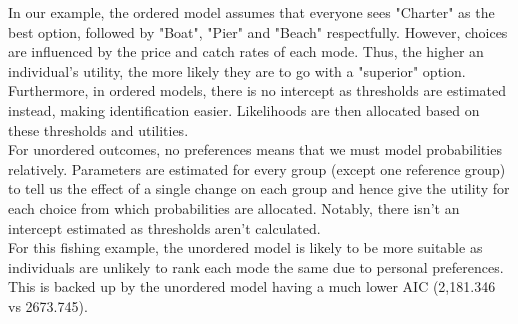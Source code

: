 \documentclass[12pt]{article}
\begin{document}
{In our example, the ordered model assumes that everyone sees "Charter" as the best option, followed by "Boat", "Pier" and "Beach" respectfully. However, choices are influenced by the price and catch rates of each mode. Thus, the higher an individual's utility, the more likely they are to go with a "superior" option. Furthermore, in ordered models, there is no intercept as thresholds are estimated instead, making identification easier. Likelihoods are then allocated based on these thresholds and utilities.\\

For unordered outcomes, no preferences means that we must model probabilities relatively. Parameters are estimated for every group (except one reference group) to tell us the effect of a single change on each group and hence give the utility for each choice from which probabilities are allocated. Notably, there isn't an intercept estimated as thresholds aren't calculated.\\

For this fishing example, the unordered model is likely to be more suitable as individuals are unlikely to rank each mode the same due to personal preferences. This is backed up by the unordered model having a much lower AIC (2,181.346 vs 2673.745).









}
\end{document}
